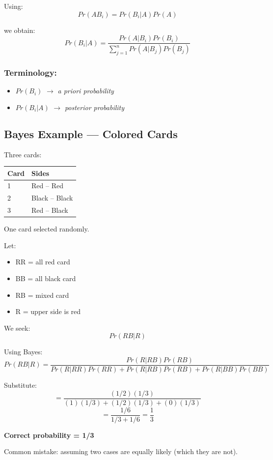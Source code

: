 \documentclass[12pt]{article}
\begin{document}
Using:
\[
Pr(AB_i) = Pr(B_i|A)Pr(A)
\]

we obtain:
\[
Pr(B_i|A) = \frac{Pr(A|B_i)Pr(B_i)}{\sum_{j=1}^n Pr(A|B_j)Pr(B_j)}
\]

\subsubsection*{Terminology:}

\begin{itemize}
\item $Pr(B_i)$ $\rightarrow$ \textit{a priori probability}
\item $Pr(B_i | A)$ $\rightarrow$ \textit{posterior probability}
\end{itemize}

\subsection{Bayes Example — Colored Cards}

Three cards:

\begin{center}
\begin{tabular}{ll}
\toprule
Card & Sides \\
\midrule
1 & Red – Red \\
2 & Black – Black \\
3 & Red – Black \\
\bottomrule
\end{tabular}
\end{center}

One card selected randomly.

Let:
\begin{itemize}
\item RR = all red card
\item BB = all black card
\item RB = mixed card
\item R = upper side is red
\end{itemize}

We seek:
\[
Pr(RB | R)
\]

Using Bayes:
\[
Pr(RB|R)=\frac{Pr(R|RB)Pr(RB)}{Pr(R|RR)Pr(RR)+Pr(R|RB)Pr(RB)+Pr(R|BB)Pr(BB)}
\]

Substitute:
\[
=\frac{(1/2)(1/3)}{(1)(1/3)+(1/2)(1/3)+(0)(1/3)}
\]
\[
=\frac{1/6}{1/3+1/6}=\frac{1}{3}
\]

\textbf{Correct probability = 1/3}

Common mistake: assuming two cases are equally likely (which they are not).
\end{document}
